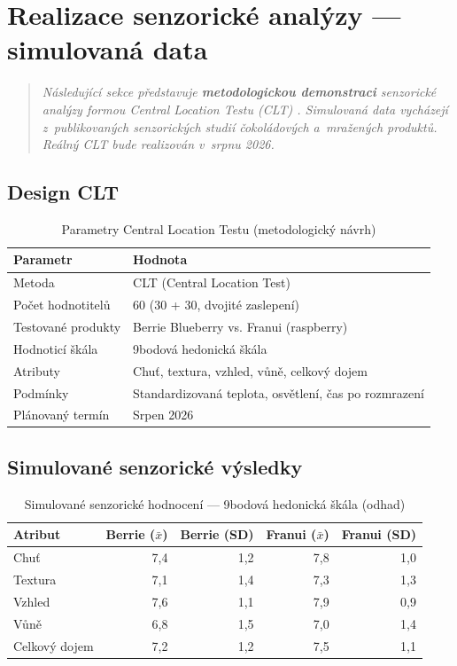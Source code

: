 \section{Realizace senzorické analýzy — simulovaná data}
\label{sec:res_sensory_clt}

\begin{quote}
\textit{Následující sekce představuje \textbf{metodologickou demonstraci} senzorické analýzy formou Central Location Testu (CLT) \parencite{lawless_heymann_2010, ruiz_capillas_2021}. Simulovaná data vycházejí z~publikovaných senzorických studií čokoládových a~mražených produktů. Reálný CLT bude realizován v~srpnu 2026.}
\end{quote}

\subsection{Design CLT}

\begin{table}[H]
\centering
\caption{Parametry Central Location Testu (metodologický návrh)}
\label{tab:clt_design}
\begin{tabular}{ll}
\toprule
\textbf{Parametr} & \textbf{Hodnota} \\
\midrule
Metoda & CLT (Central Location Test) \\
Počet hodnotitelů & 60 (30 + 30, dvojité zaslepení) \\
Testované produkty & Berrie Blueberry vs. Franui (raspberry) \\
Hodnoticí škála & 9bodová hedonická škála \\
Atributy & Chuť, textura, vzhled, vůně, celkový dojem \\
Podmínky & Standardizovaná teplota, osvětlení, čas po rozmrazení \\
Plánovaný termín & Srpen 2026 \\
\bottomrule
\end{tabular}
\end{table}

\subsection{Simulované senzorické výsledky}

\begin{table}[H]
\centering
\caption{Simulované senzorické hodnocení — 9bodová hedonická škála (odhad)}
\label{tab:clt_results}
\begin{tabular}{lrrrr}
\toprule
\textbf{Atribut} & \textbf{Berrie ($\bar{x}$)} & \textbf{Berrie (SD)} & \textbf{Franui ($\bar{x}$)} & \textbf{Franui (SD)} \\
\midrule
Chuť & 7,4 & 1,2 & 7,8 & 1,0 \\
Textura & 7,1 & 1,4 & 7,3 & 1,3 \\
Vzhled & 7,6 & 1,1 & 7,9 & 0,9 \\
Vůně & 6,8 & 1,5 & 7,0 & 1,4 \\
Celkový dojem & 7,2 & 1,2 & 7,5 & 1,1 \\
\bottomrule
\end{tabular}
\end{table}

